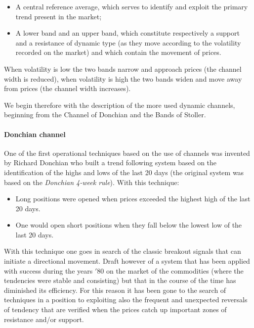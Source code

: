 \begin{itemize}
\setlength\itemsep{0.3em}
\item A central reference average, which serves to identify and exploit the primary trend present in the market;
\item A lower band and an upper band, which constitute respectively a support and a resistance of dynamic type (as they move according to the volatility recorded on the market) and which contain the movement of prices.
\end{itemize}

When volatility is low the two bands narrow and approach prices (the channel width is reduced), when volatility is high the two bands widen and move away from prices (the channel width increases). 

We begin therefore with the description of the more used dynamic channels, beginning from the Channel of Donchian and the Bands of Stoller. 

\paragraph{\textbf{Donchian channel}}\mbox{}

One of the first operational techniques based on the use of channels was invented by Richard Donchian who built a trend following system based on the identification of the highs and lows of the last 20 days (the original system was based on the \textit{Donchian 4-week rule}). With this technique:

\begin{itemize}
\setlength\itemsep{0.3em}
\item Long positions were opened when prices exceeded the highest high of the last 20 days.
\item One would open short positions when they fall below the lowest low of the last 20 days.
\end{itemize}  

With this technique one goes in search of the classic breakout signals that can initiate a directional movement. Draft however of a system that has been applied with success during the years $'80$ on the market of the commodities (where the tendencies were stable and consisting) but that in the course of the time has diminished its efficiency. For this reason it has been gone to the search of techniques in a position to exploiting also the frequent and unexpected reversals of tendency that are verified when the prices catch up important zones of resistance and/or support.

